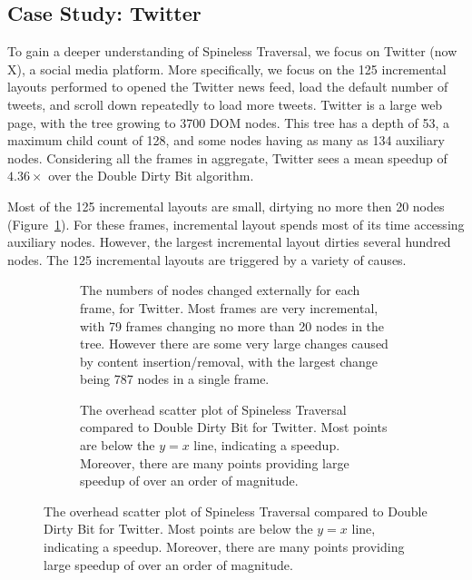 \subsection{Case Study: Twitter}
To gain a deeper understanding of Spineless Traversal,
  we focus on Twitter (now X), a social media platform.
More specifically,
  we focus on the 125 incremental layouts performed
  to opened the Twitter news feed,
  load the default number of tweets,
  and scroll down repeatedly to load more tweets.
Twitter is a large web page,
  with the tree growing to 3700 DOM nodes.
This tree has a depth of 53,
  a maximum child count of 128,
  and some nodes having as many as 134 auxiliary nodes. 
Considering all the frames in aggregate,
  Twitter sees a mean speedup of $4.36\times$ 
  over the Double Dirty Bit algorithm.

Most of the 125 incremental layouts are small,
  dirtying no more then 20 nodes (Figure~\ref{fig:case-study}).
For these frames,
  incremental layout spends most of its time
  accessing auxiliary nodes.
However, the largest incremental layout
  dirties several hundred nodes.
The 125 incremental layouts are triggered
  by a variety of causes.

\begin{figure}
\begin{subfigure}{0.48\linewidth}
    
    \caption{The numbers of nodes changed externally for each frame, for Twitter. Most frames are very incremental, with 79 frames changing no more than 20 nodes in the tree. However there are some very large changes caused by content insertion/removal, with the largest change being 787 nodes in a single frame.}
    \label{fig:case-study}
\end{subfigure}\hfill%
\begin{subfigure}{0.48\linewidth}
    
    \caption{The overhead scatter plot of Spineless Traversal compared to Double Dirty Bit for Twitter. Most points are below the $y=x$ line, indicating a speedup. Moreover, there are many points providing large speedup of over an order of magnitude.}
\end{subfigure}
\end{figure}

